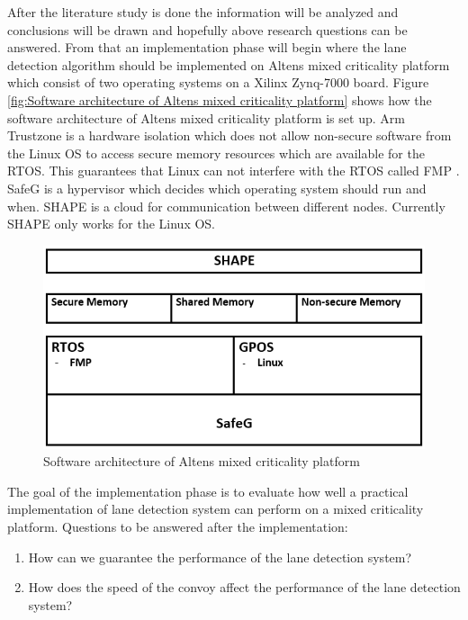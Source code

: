After the literature study is done the information will be analyzed and conclusions will be drawn and hopefully above research questions can be answered. From that an implementation phase will begin where the lane detection algorithm should be implemented on  Altens mixed criticality platform which consist of two operating systems on a Xilinx Zynq-7000 board. Figure \ref{fig:Software architecture of  Altens mixed criticality platform} shows how the software architecture of Altens mixed criticality platform is set up. Arm Trustzone is a hardware isolation which does not allow non-secure software from the Linux OS to access secure memory resources which are available for the RTOS. This guarantees that Linux can not interfere with the RTOS called FMP \cite{zaki2016}. SafeG is a hypervisor which decides which operating system should run and when. SHAPE is a cloud for communication between different nodes. Currently SHAPE only works for the Linux OS.


\begin{figure}[H]
  \includegraphics[width=\textwidth]{./img/architecture.png}
  \centering
  \caption{Software architecture of Altens mixed criticality platform}
  \label{fig:Software architecture of Altens mixed criticality platform}
\end{figure}

The goal of the implementation phase is to evaluate how well a practical implementation of lane detection system can perform on a mixed criticality platform. Questions to be answered after the implementation:

\begin{enumerate}  
\item How can we guarantee the performance of the lane detection system?
\item How does the speed of the convoy affect the performance of the lane detection system?
\end{enumerate}

